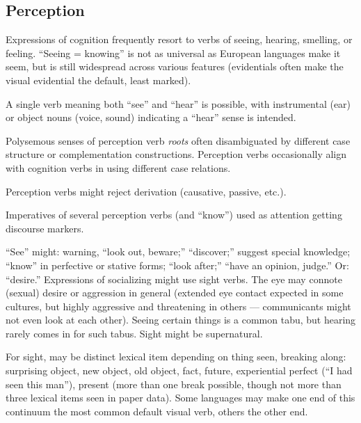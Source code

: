 \documentclass[11pt]{article}
\begin{document}
\subsection{Perception}
Expressions of cognition frequently resort to verbs of seeing,
hearing, smelling, or feeling.  ``Seeing = knowing'' is not as
universal as European languages make it seem, but is still widespread
across various features (evidentials often make the visual evidential
the default, least marked).

A single verb meaning both ``see'' and ``hear'' is possible, with
instrumental (ear) or object nouns (voice, sound) indicating a
``hear'' sense is intended.

Polysemous senses of perception verb \textit{roots} often
disambiguated by different case structure or complementation
constructions.  Perception verbs occasionally align with cognition
verbs in using different case relations.

Perception verbs might reject derivation (causative, passive, etc.).

Imperatives of several perception verbs (and ``know'') used as
attention getting discourse markers.

``See'' might: warning, ``look out, beware;'' ``discover;'' suggest
special knowledge; ``know'' in perfective or stative forms; ``look
after;'' ``have an opinion, judge.'' Or: ``desire.''  Expressions of
socializing might use sight verbs.  The eye may connote (sexual)
desire or aggression in general (extended eye contact expected in some
cultures, but highly aggressive and threatening in others —
communicants might not even look at each other).  Seeing certain
things is a common tabu, but hearing rarely comes in for such tabus.
Sight might be supernatural.

For sight, may be distinct lexical item depending on thing seen,
breaking along: surprising object, new object, old object, fact,
future, experiential perfect (``I had seen this man''), present (more
than one break possible, though not more than three lexical items seen
in paper data).  Some languages may make one end of this continuum the
most common default visual verb, others the other end.
\end{document}
